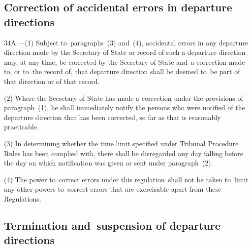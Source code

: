 \documentclass[12pt,a4paper]{article}
\begin{document}
\subsection[34A. Correction of accidental errors in departure directions]{Correction of accidental errors in departure directions}

34A.—(1) Subject to~paragraphs~(3) and~(4), accidental errors in any departure direction made by the Secretary of State or record of such a departure direction may, at any time, be corrected by the Secretary of State and~a correction made to, or to~the record of, that departure direction shall be deemed to~be part of that direction or of that record.

(2) Where the Secretary of State has made a correction under the provisions of paragraph~(1), he shall immediately notify the persons who were notified of the departure direction that has been corrected, so far as that is reasonably practicable.

(3) In determining whether the time limit specified 
under Tribunal Procedure Rules  %
has been complied with, there shall be disregarded any day falling before the day on which notification was given or sent under paragraph~(2).

(4) The power to~correct errors under this regulation~shall not be taken to~limit any other powers to~correct errors that are exercisable apart from these Regulations.


\subsection[35. Termination and~suspension of departure directions]{Termination and~suspension of departure directions}
\end{document}

